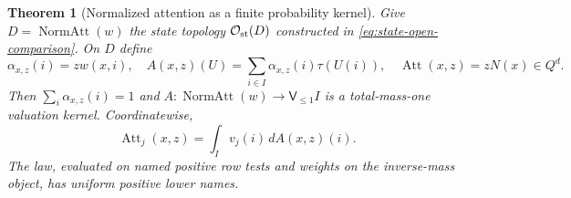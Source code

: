 \documentclass[11pt,a4paper]{article}
\newtheorem{theorem}{Theorem}[section]
\theoremstyle{definition}
\theoremstyle{remark}\newaliascnt{remark}{theorem}
\numberwithin{equation}{section}
\begin{document}
\begin{theorem}[Normalized attention as a finite probability kernel]
\label{thm:attention-kernel}
Give $D=\operatorname{NormAtt}(w)$ the state topology $\mathcal O_{\rm st}(D)$ constructed in \eqref{eq:state-open-comparison}. On $D$ define
\begin{equation}\label{eq:attention-formula}
 \alpha_{x,z}(i)=z w(x,i),\quad
 A(x,z)(U)=\sum_{i\in I}\alpha_{x,z}(i)\tau(U(i)),\quad
 \operatorname{Att}(x,z)=zN(x)\in Q^d.
\end{equation}
Then $\sum_i\alpha_{x,z}(i)=1$ and
$A:\operatorname{NormAtt}(w)\to\mathsf V_{\le1}I$ is a total-mass-one
valuation kernel. Coordinatewise,
\begin{equation}\label{eq:attention-expectation}
 \operatorname{Att}_j(x,z)=\int_Iv_j(i)\,dA(x,z)(i).
\end{equation}
The law, evaluated on named positive row tests and weights on the inverse-mass object, has uniform positive lower names.
\end{theorem}
\end{document}
